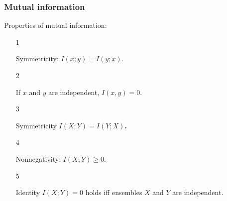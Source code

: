 \documentclass[14pt]{beamer}
\begin{document}
\begin{frame}
\frametitle{Mutual information}
Properties of mutual information:

\begin{enumerate}

    \item[1]
    \begin{prop} \label{p5_1}
    Symmetricity: $I(x;y) = I(y;x)$.
    \end{prop}
    
    \pause \item[2] 
    \begin{prop} \label{p5_2}
    If $x$ and $y$ are independent, $I(x,y) = 0$.
    \end{prop}
    
    \pause \item[3] 
    \begin{prop} \label{p5_3}
    Symmetricity $I(X;Y) = I(Y;X)$\textbf{.}
    \end{prop}
    
    \pause \item[4] 
    \begin{prop} \label{p5_4}
    Nonnegativity: $I(X;Y) \ge 0$.
    \end{prop}
    
    \pause \item[5] 
    \begin{prop} \label{p5_5}
    Identity $I(X;Y) = 0$ holds iff  ensembles $X$ and $Y$ are independent.
    \end{prop}
    
    
\end{enumerate}
\end{frame}
\end{document}
